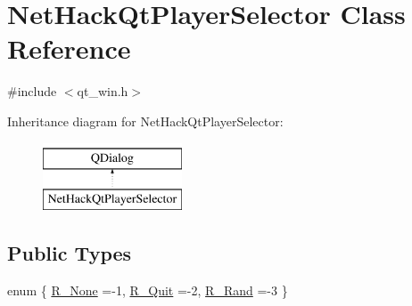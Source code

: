 \hypertarget{classNetHackQtPlayerSelector}{\section{Net\+Hack\+Qt\+Player\+Selector Class Reference}
\label{classNetHackQtPlayerSelector}
}


{\ttfamily \#include $<$qt\+\_\+win.\+h$>$}

Inheritance diagram for Net\+Hack\+Qt\+Player\+Selector\+:\begin{figure}[H]
\begin{center}
\leavevmode
\includegraphics[height=2.000000cm]{classNetHackQtPlayerSelector}
\end{center}
\end{figure}
\subsection*{Public Types}
\begin{DoxyCompactItemize}
\item 
enum \{ \hyperlink{classNetHackQtPlayerSelector_af57edf87b45bd82ea55f237a6f1c9ba6a22a35cbb102b9d39f7cc4fe827744f09}{R\+\_\+\+None} =-\/1, 
\hyperlink{classNetHackQtPlayerSelector_af57edf87b45bd82ea55f237a6f1c9ba6a1e107c4db666f8c9da01f89bf3d8d4fb}{R\+\_\+\+Quit} =-\/2, 
\hyperlink{classNetHackQtPlayerSelector_af57edf87b45bd82ea55f237a6f1c9ba6a5ae88ed5e5ee6384512415f43fdc47ec}{R\+\_\+\+Rand} =-\/3
 \}
\end{DoxyCompactItemize}
